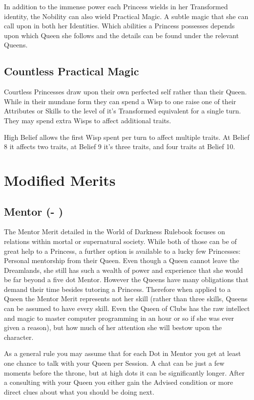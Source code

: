 In addition to the immense power each Princess wields in her Transformed identity, the Nobility can also wield Practical Magic. A subtle magic that she can call upon in both her Identities. Which abilities a Princess possesses depends upon which Queen she follows and the details can be found under the relevant Queens. 

\subsection*{Countless Practical Magic}

Courtless Princesses draw upon their own perfected self rather than their Queen. While in their mundane form they can spend a Wisp to one raise one of their Attributes or Skills to the level of it's Transformed equivalent for a single turn. They may spend extra Wisps to affect additional traits.

High Belief allows the first Wisp spent per turn to affect multiple traits. At Belief 8 it affects two traits, at Belief 9 it's three traits, and four traits at Belief 10.

\section*{Modified Merits}

\subsection*{Mentor (\textbullet - \textbullet\textbullet\textbullet\textbullet\textbullet)}

The Mentor Merit detailed in the World of Darkness Rulebook focuses on relations within mortal or supernatural society. While both of those can be of great help to a Princess, a further option is available to a lucky few Princesses: Personal mentorship from their Queen. Even though a Queen cannot leave the Dreamlands, she still has such a wealth of power and experience that she would be far beyond a five dot Mentor. However the Queens have many obligations that demand their time besides tutoring a Princess. Therefore when applied to a Queen the Mentor Merit represents not her skill (rather than three skills, Queens can be assumed to have every skill. Even the Queen of Clubs has the raw intellect and magic to master computer programming in an hour or so if she was ever given a reason), but how much of her attention she will bestow upon the character.

As a general rule you may assume that for each Dot in Mentor you get at least one chance to talk with your Queen per Session. A chat can be just a few moments before the throne, but at high dots it can be significantly longer. After a consulting with your Queen you either gain the Advised condition or more direct clues about what you should be doing next. 

